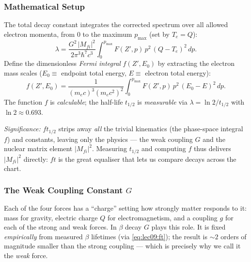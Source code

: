 \subsubsection*{Mathematical Setup}
The total decay constant integrates the corrected spectrum over all allowed
electron momenta, from $0$ to the maximum $p_\text{max}$ (set by $T_e=Q$):
\begin{equation}
  \label{eq:lec09:lambda_int}
  \lambda = \frac{G^2\,|M_{fi}|^2}{2\pi^3\hbar^7 c^3}
            \int_0^{p_\text{max}} F(Z',p)\,p^2\,(Q-T_e)^2\,dp.
\end{equation}
Define the dimensionless \emph{Fermi integral} $f(Z',E_0)$ by extracting the
electron mass scales ($E_0\equiv$ endpoint total energy, $E\equiv$ electron total
energy):
\begin{equation}
  \label{eq:lec09:fermi_integral}
  f(Z',E_0) = \frac{1}{(m_ec)^3(m_ec^2)^2}
              \int_0^{p_\text{max}} F(Z',p)\,p^2\,(E_0-E)^2\,dp.
\end{equation}
The function $f$ is \emph{calculable}; the half-life $t_{1/2}$ is
\emph{measurable} via $\lambda=\ln2/t_{1/2}$ with $\ln2\approx0.693$.

\textit{Significance:} $ft_{1/2}$ strips away \emph{all} the trivial kinematics
(the phase-space integral $f$) and constants, leaving only the physics --- the
weak coupling $G$ and the nuclear matrix element $|M_{fi}|^2$. Measuring $t_{1/2}$
and computing $f$ thus delivers $|M_{fi}|^2$ directly: $ft$ is the great
equaliser that lets us compare decays across the chart.

\subsubsection*{The Weak Coupling Constant $G$}
Each of the four forces has a ``charge'' setting how strongly matter responds to
it: mass for gravity, electric charge $Q$ for electromagnetism, and a coupling
$g$ for each of the strong and weak forces. In $\beta$ decay $G$ plays this role.
It is fixed \emph{empirically} from measured $\beta$ lifetimes (via
\eqref{eq:lec09:ft}); the result is $\sim2$ orders of magnitude smaller than the
strong coupling --- which is precisely why we call it the \emph{weak} force.

